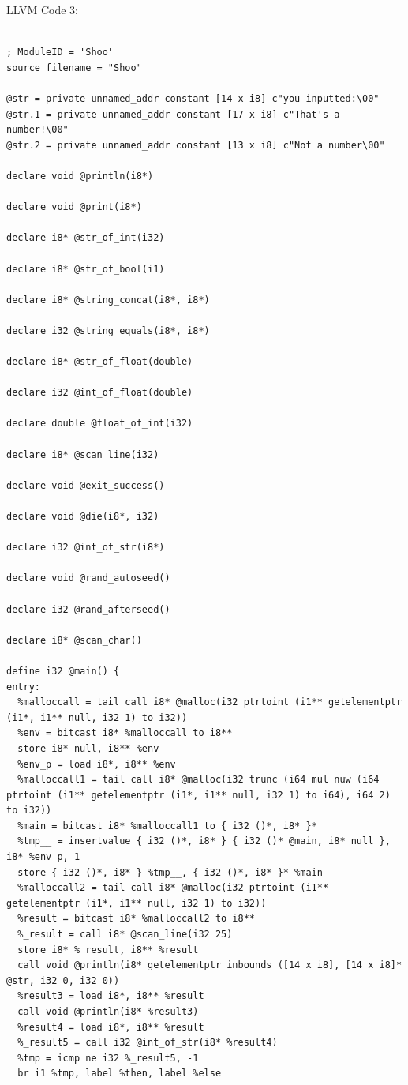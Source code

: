 \documentclass[12pt]{article}
\begin{document}
LLVM Code 3:\\
\\
\begin{mdframed}[hidealllines=true,backgroundcolor=green!10]
\begin{lstlisting}
; ModuleID = 'Shoo'
source_filename = "Shoo"

@str = private unnamed_addr constant [14 x i8] c"you inputted:\00"
@str.1 = private unnamed_addr constant [17 x i8] c"That's a number!\00"
@str.2 = private unnamed_addr constant [13 x i8] c"Not a number\00"

declare void @println(i8*)

declare void @print(i8*)

declare i8* @str_of_int(i32)

declare i8* @str_of_bool(i1)

declare i8* @string_concat(i8*, i8*)

declare i32 @string_equals(i8*, i8*)

declare i8* @str_of_float(double)

declare i32 @int_of_float(double)

declare double @float_of_int(i32)

declare i8* @scan_line(i32)

declare void @exit_success()

declare void @die(i8*, i32)

declare i32 @int_of_str(i8*)

declare void @rand_autoseed()

declare i32 @rand_afterseed()

declare i8* @scan_char()

define i32 @main() {
entry:
  %malloccall = tail call i8* @malloc(i32 ptrtoint (i1** getelementptr (i1*, i1** null, i32 1) to i32))
  %env = bitcast i8* %malloccall to i8**
  store i8* null, i8** %env
  %env_p = load i8*, i8** %env
  %malloccall1 = tail call i8* @malloc(i32 trunc (i64 mul nuw (i64 ptrtoint (i1** getelementptr (i1*, i1** null, i32 1) to i64), i64 2) to i32))
  %main = bitcast i8* %malloccall1 to { i32 ()*, i8* }*
  %tmp__ = insertvalue { i32 ()*, i8* } { i32 ()* @main, i8* null }, i8* %env_p, 1
  store { i32 ()*, i8* } %tmp__, { i32 ()*, i8* }* %main
  %malloccall2 = tail call i8* @malloc(i32 ptrtoint (i1** getelementptr (i1*, i1** null, i32 1) to i32))
  %result = bitcast i8* %malloccall2 to i8**
  %_result = call i8* @scan_line(i32 25)
  store i8* %_result, i8** %result
  call void @println(i8* getelementptr inbounds ([14 x i8], [14 x i8]* @str, i32 0, i32 0))
  %result3 = load i8*, i8** %result
  call void @println(i8* %result3)
  %result4 = load i8*, i8** %result
  %_result5 = call i32 @int_of_str(i8* %result4)
  %tmp = icmp ne i32 %_result5, -1
  br i1 %tmp, label %then, label %else


\end{lstlisting}
\end{mdframed}
\end{document}
